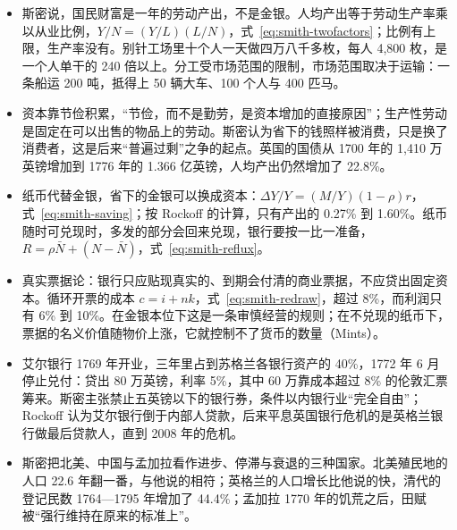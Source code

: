 \begin{takeaways}
\begin{itemize}
\item 斯密说，国民财富是一年的劳动产出，不是金银。人均产出等于劳动生产率乘以从业比例，$Y/N=(Y/L)(L/N)$，式~\eqref{eq:smith-twofactors}；比例有上限，生产率没有。别针工场里十个人一天做四万八千多枚，每人 4,800 枚，是一个人单干的 240 倍以上。分工受市场范围的限制，市场范围取决于运输：一条船运 200 吨，抵得上 50 辆大车、100 个人与 400 匹马。
\item 资本靠节俭积累，“节俭，而不是勤劳，是资本增加的直接原因”；生产性劳动是固定在可以出售的物品上的劳动。斯密认为省下的钱照样被消费，只是换了消费者，这是后来“普遍过剩”之争的起点。英国的国债从 1700 年的 1,410 万英镑增加到 1776 年的 1.366 亿英镑，人均产出仍然增加了 22.8\%。
\item 纸币代替金银，省下的金银可以换成资本：$\Delta Y/Y=(M/Y)(1-\rho)r$，式~\eqref{eq:smith-saving}；按 Rockoff 的计算，只有产出的 0.27\% 到 1.60\%。纸币随时可兑现时，多发的部分会回来兑现，银行要按一比一准备，$R=\rho\bar N+(N-\bar N)$，式~\eqref{eq:smith-reflux}。
\item 真实票据论：银行只应贴现真实的、到期会付清的商业票据，不应贷出固定资本。循环开票的成本 $c=i+nk$，式~\eqref{eq:smith-redraw}，超过 8\%，而利润只有 6\% 到 10\%。在金银本位下这是一条审慎经营的规则；在不兑现的纸币下，票据的名义价值随物价上涨，它就控制不了货币的数量（Mints）。
\item 艾尔银行 1769 年开业，三年里占到苏格兰各银行资产的 40\%，1772 年 6 月停止兑付：贷出 80 万英镑，利率 5\%，其中 60 万靠成本超过 8\% 的伦敦汇票筹来。斯密主张禁止五英镑以下的银行券，条件以内银行业“完全自由”；Rockoff 认为艾尔银行倒于内部人贷款，后来平息英国银行危机的是英格兰银行做最后贷款人，直到 2008 年的危机。
\item 斯密把北美、中国与孟加拉看作进步、停滞与衰退的三种国家。北美殖民地的人口 22.6 年翻一番，与他说的相符；英格兰的人口增长比他说的快，清代的登记民数 1764—1795 年增加了 44.4\%；孟加拉 1770 年的饥荒之后，田赋被“强行维持在原来的标准上”。
\end{itemize}
\end{takeaways}

